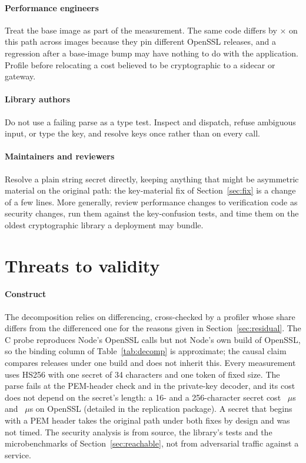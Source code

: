 \documentclass[preprint,12pt,authoryear]{elsarticle}
\begin{document}
\paragraph{Performance engineers} Treat the base image as part of the
measurement. The same code differs by \SpanProbeThrows$\times$ on this path
across images because they pin different OpenSSL releases, and a regression
after a base-image bump may have nothing to do with the application. Profile
before relocating a cost believed to be cryptographic to a sidecar or gateway.

\paragraph{Library authors} Do not use a failing parse as a type test. Inspect
and dispatch, refuse ambiguous input, or type the key, and resolve keys once
rather than on every call.

\paragraph{Maintainers and reviewers} Resolve a plain string secret directly,
keeping anything that might be asymmetric material on the original path: the
key-material fix of Section~\ref{sec:fix} is a change of a few lines. More
generally, review performance changes to verification code as security
changes, run them against the key-confusion tests, and time them on the oldest
cryptographic library a deployment may bundle.

\section{Threats to validity}\label{sec:threats}

\paragraph{Construct} The decomposition relies on differencing, cross-checked
by a profiler whose share differs from the differenced one for the reasons
given in Section~\ref{sec:residual}. The C probe reproduces Node's OpenSSL
calls but not Node's own build of OpenSSL, so the binding column of
Table~\ref{tab:decomp} is approximate; the causal claim compares releases under
one build and does not inherit this. Every measurement uses HS256 with one
secret of 34 characters and one token of fixed size. The parse fails at the
PEM-header check and in the private-key decoder, and its cost does not depend
on the secret's length: a 16- and a 256-character secret cost
\ForgedEighteenProbeSixteen~$\mu$s and \ForgedEighteenProbeTwoFiftySix~$\mu$s on
OpenSSL \ForgedEighteenOpenssl{} (detailed in the replication package). A secret that
begins with a PEM header takes the original path under both fixes by design
and was not timed. The security analysis is from source, the library's tests
and the microbenchmarks of Section~\ref{sec:reachable}, not from adversarial
traffic against a service.
\end{document}
